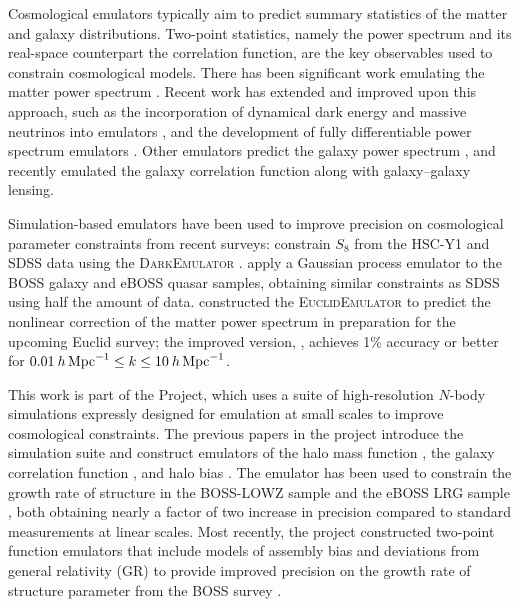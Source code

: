 Cosmological emulators typically aim to predict summary statistics of the matter and galaxy distributions.
Two-point statistics, namely the power spectrum and its real-space counterpart the correlation function, are the key observables used to constrain cosmological models.
There has been significant work emulating the matter power spectrum \citep{Heitmann2009, Lawrence2017, Giblin2019, Ho2022}.
Recent work has extended and improved upon this approach, such as the incorporation of dynamical dark energy and massive neutrinos into emulators \citep{Angulo2021}, and the development of fully differentiable power spectrum emulators \citep{SpurioMancini2022, derose_neural_2022}.
Other emulators predict the galaxy power spectrum \citep{Kwan2015, Pellejero-Ibanez2020, kokron_cosmology_2021}, and \cite{Wibking2019} recently emulated the galaxy correlation function along with galaxy--galaxy lensing.

Simulation-based emulators have been used to improve precision on cosmological parameter constraints from recent surveys:
\cite{Miyatake2021} constrain $S_8$ from the HSC-Y1 and SDSS data using the \textsc{DarkEmulator} \citep{Nishimichi2019}.
\cite{Neveux2022} apply a Gaussian process emulator to the BOSS galaxy and eBOSS quasar samples, obtaining similar constraints as SDSS using half the amount of data.
\cite{EuclidPrepII} constructed the \textsc{EuclidEmulator} to predict the nonlinear correction of the matter power spectrum in preparation for the upcoming Euclid survey; the improved version, \cite{EuclidPrepIX}, achieves 1\% accuracy or better for $0.01 \: h\,\mathrm{Mpc}^{-1} \leq k \leq 10 \: h\,\mathrm{Mpc}^{-1}$.

This work is part of the \aemulus Project, which uses a suite of high-resolution $N$-body simulations expressly designed for emulation at small scales to improve cosmological constraints.
The previous papers in the project introduce the simulation suite \citep{DeRose2018} and construct emulators of the halo mass function \citep{McClintock2018}, the galaxy correlation function \citep{Zhai2019}, and halo bias \citep{McClintock2019}.
The \aemulus emulator has been used to constrain the growth rate of structure in the BOSS-LOWZ sample \citep{Lange2022} and the eBOSS LRG sample \citep{Chapman2021}, both obtaining nearly a factor of two increase in precision compared to standard measurements at linear scales.
Most recently, the \aemulus project constructed two-point function emulators that include models of assembly bias and deviations from general relativity (GR) to provide improved precision on the growth rate of structure parameter from the BOSS survey \citep{Zhai2022}.

